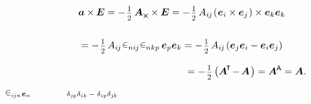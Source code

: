 \nopagebreak\vspace{-0.1em}
\begin{gather*}
\bm{a} \times\hspace{-0.1ex} \UnitDyad
= - \hspace{.2ex} \smalldisplaystyleonehalf \hspace{.4ex} \bm{A}_{\Xcompanion} \times \UnitDyad
= - \hspace{.2ex} \smalldisplaystyleonehalf \, A_{i\hspace{-0.1ex}j} \hspace{-0.2ex}
\left( \hspace{.1ex} \tikzmark{beginFirstCrossProduct} {\bm{e}_i \times \bm{e}_j} \tikzmark{endFirstCrossProduct} \hspace{.16ex} \right)
\times
\bm{e}_k \bm{e}_k
%
\\[1.5em]
%
= - \hspace{.2ex} \smalldisplaystyleonehalf \hspace{.32ex} A_{i\hspace{-0.1ex}j} \hspace{.12ex}
\tikzmark{beginTwoPermutationParities} \permutationsparitysymbols{ni\hspace{-0.1ex}j} \permutationsparitysymbols{nkp} \tikzmark{endTwoPermutationParities}
\hspace{.32ex} \bm{e}_p \bm{e}_k = - \hspace{.2ex} \smalldisplaystyleonehalf \hspace{.32ex} A_{i\hspace{-0.1ex}j} \hspace{-0.1ex} \left( \bm{e}_j \bm{e}_i - \bm{e}_i \bm{e}_j \right)
%
\\[.8em]
%
\hspace{13.2em}= - \hspace{.2ex} \smalldisplaystyleonehalf \left({ \bm{A}^{\hspace{-0.1em}\T} \hspace{-0.25ex} - \hspace{-0.2ex} \bm{A} \hspace{.2ex}}\right) = \bm{A}^{\mathsf{\hspace{-0.1ex}A}} = \bm{A}.
\end{gather*}
{${ \scriptstyle \permutationsparitysymbols{i\hspace{-0.1ex}jn} \bm{e}_n }$}
%
{${ \scriptstyle \hspace{3.2em}
   \delta_{j\hspace{-0.1ex}p}
   \delta_{ik}
   \, - \;
   \delta_{ip}
   \delta_{j\hspace{-0.1ex}k}
}$}

